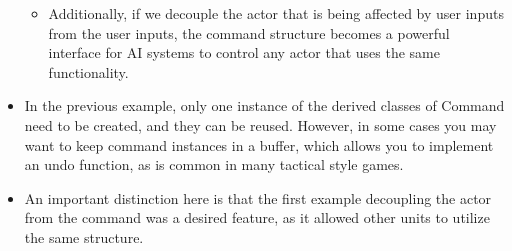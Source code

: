\documentclass{article}
\begin{document}
\begin{itemize}
\begin{itemize}
        \item Additionally, if we decouple the actor that is being affected by user inputs from the user inputs, the command structure becomes a powerful interface for AI systems to control any actor that uses the same functionality.
    \end{itemize}
    \item In the previous example, only one instance of the derived classes of Command need to be created, and they can be reused. However, in some cases you may want to keep command instances in a buffer, which allows you to implement an undo function, as is common in many tactical style games.
    \item An important distinction here is that the first example decoupling the actor from the command was a desired feature, as it allowed other units to utilize the same structure. 
\end{itemize}
\end{document}
